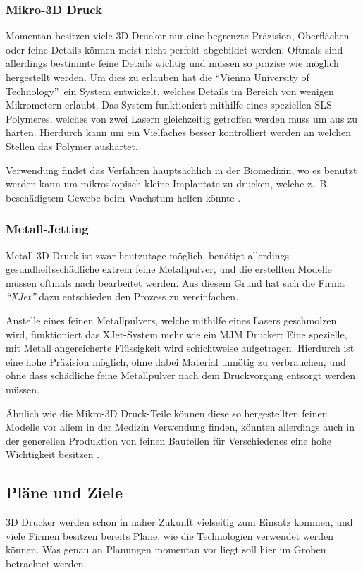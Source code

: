 \subsubsection{Mikro-3D Druck}
Momentan besitzen viele 3D Drucker nur eine begrenzte Präzision, Oberflächen oder feine Details können meist nicht perfekt abgebildet werden. Oftmals sind allerdings bestimmte feine Details wichtig und müssen so präzise wie möglich hergestellt werden. Um dies zu erlauben hat die \textquotedblleft Vienna University of Technology\textquotedblright ~ein System entwickelt, welches Details im Bereich von wenigen Mikrometern erlaubt.
Das System funktioniert mithilfe eines speziellen SLS-Polymeres, welches von zwei Lasern gleichzeitig getroffen werden muss um aus zu härten. Hierdurch kann um ein Vielfaches besser kontrolliert werden an welchen Stellen das Polymer aushärtet.

Verwendung findet das Verfahren hauptsächlich in der Biomedizin, wo es benutzt werden kann um mikroskopisch kleine Implantate zu drucken, welche z.~B. beschädigtem Gewebe beim Wachstum helfen könnte \parencite{MICROPRINT}.

\subsubsection{Metall-Jetting}
Metall-3D Druck ist zwar heutzutage möglich, benötigt allerdings gesundheitsschädliche extrem feine Metallpulver, und die erstellten Modelle müssen oftmals nach bearbeitet werden. Aus diesem Grund hat sich die Firma \emph{\textquotedblleft XJet\textquotedblright} dazu entschieden den Prozess zu vereinfachen. 

Anstelle eines feinen Metallpulvers, welche mithilfe eines Lasers geschmolzen wird, funktioniert das XJet-System mehr wie ein MJM Drucker: Eine spezielle, mit Metall angereicherte Flüssigkeit wird schichtweise aufgetragen. Hierdurch ist eine hohe Präzision möglich, ohne dabei Material unnötig zu verbrauchen, und ohne dass schädliche feine Metallpulver nach dem Druckvorgang entsorgt werden müssen.

Ähnlich wie die Mikro-3D Druck-Teile können diese so hergestellten feinen Modelle vor allem in der Medizin Verwendung finden, könnten allerdings auch in der generellen Produktion von feinen Bauteilen für Verschiedenes eine hohe Wichtigkeit besitzen \parencite{XJET}.


\subsection{Pläne und Ziele}
3D Drucker werden schon in naher Zukunft vielseitig zum Einsatz kommen, und viele Firmen besitzen bereits Pläne, wie die Technologien verwendet werden können. Was genau an Planungen momentan vor liegt soll hier im Groben betrachtet werden.


